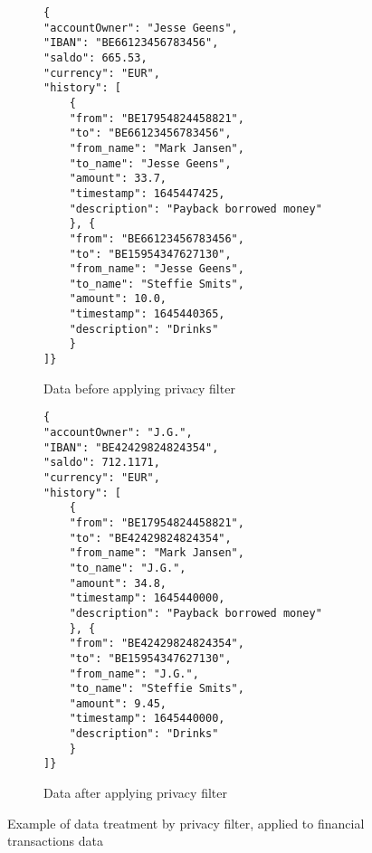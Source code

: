 \begin{figure}[H]
\centering
\begin{subfigure}{.5\textwidth}
  \centering
  \begin{verbatim}
{
"accountOwner": "Jesse Geens",
"IBAN": "BE66123456783456",
"saldo": 665.53,
"currency": "EUR",
"history": [
    {
    "from": "BE17954824458821",
    "to": "BE66123456783456",
    "from_name": "Mark Jansen",
    "to_name": "Jesse Geens",
    "amount": 33.7,
    "timestamp": 1645447425,
    "description": "Payback borrowed money"
    }, {
    "from": "BE66123456783456",
    "to": "BE15954347627130",
    "from_name": "Jesse Geens",
    "to_name": "Steffie Smits",
    "amount": 10.0,
    "timestamp": 1645440365,
    "description": "Drinks"
    }
]}
  \end{verbatim}
  \caption{Data before applying privacy filter}
  \label{fig:data-before-privacy-filter}
\end{subfigure}%
\begin{subfigure}{.5\textwidth}
  \centering
  \begin{verbatim}
{
"accountOwner": "J.G.",
"IBAN": "BE42429824824354",
"saldo": 712.1171,
"currency": "EUR",
"history": [
    {
    "from": "BE17954824458821",
    "to": "BE42429824824354",
    "from_name": "Mark Jansen",
    "to_name": "J.G.",
    "amount": 34.8,
    "timestamp": 1645440000,
    "description": "Payback borrowed money"
    }, {
    "from": "BE42429824824354",
    "to": "BE15954347627130",
    "from_name": "J.G.",
    "to_name": "Steffie Smits",
    "amount": 9.45,
    "timestamp": 1645440000,
    "description": "Drinks"
    }
]}
  \end{verbatim}
  \caption{Data after applying privacy filter}
  \label{fig:data-after-privacy-filter}
\end{subfigure}
\caption{Example of data treatment by privacy filter, applied to financial transactions data}
\label{fig:example-treatment-privacy-filter}
\end{figure}